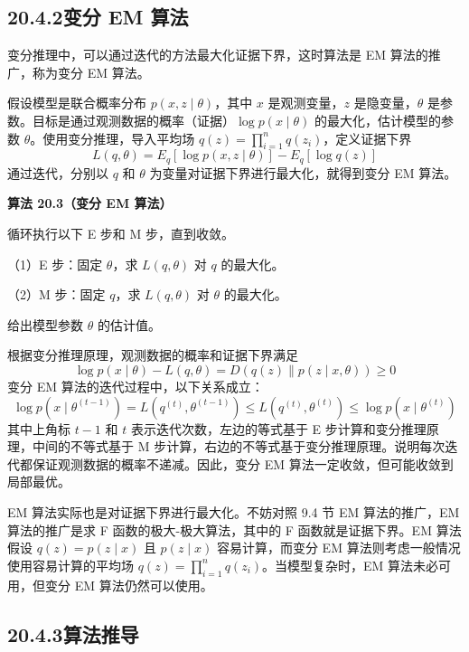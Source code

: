 \documentclass[UTF8, 12pt, fontset=fandol, oneside]{ctexart}
\begin{document}
\subsection*{20.4.2\quad 变分 EM 算法}

变分推理中，可以通过迭代的方法最大化证据下界，这时算法是 EM 算法的推广，称为变分 EM 算法。

假设模型是联合概率分布 $p(x,z\mid\theta)$，其中 $x$ 是观测变量，$z$ 是隐变量，$\theta$ 是参数。目标是通过观测数据的概率（证据）$\log p(x\mid\theta)$ 的最大化，估计模型的参数 $\theta$。使用变分推理，导入平均场 $q(z)=\prod_{i=1}^n q(z_i)$，定义证据下界
\begin{equation}
L(q,\theta)=E_q[\log p(x,z\mid\theta)]-E_q[\log q(z)]
\tag{20.39}
\end{equation}
通过迭代，分别以 $q$ 和 $\theta$ 为变量对证据下界进行最大化，就得到变分 EM 算法。

\noindent\textbf{算法 20.3（变分 EM 算法）}

循环执行以下 E 步和 M 步，直到收敛。

（1）E 步：固定 $\theta$，求 $L(q,\theta)$ 对 $q$ 的最大化。

（2）M 步：固定 $q$，求 $L(q,\theta)$ 对 $\theta$ 的最大化。

给出模型参数 $\theta$ 的估计值。

根据变分推理原理，观测数据的概率和证据下界满足
\begin{equation}
\log p(x\mid\theta)-L(q,\theta)=D(q(z)\|p(z\mid x,\theta))\geq 0
\tag{20.40}
\end{equation}
变分 EM 算法的迭代过程中，以下关系成立：
\begin{equation}
\log p(x\mid\theta^{(t-1)})=L(q^{(t)},\theta^{(t-1)})\leq L(q^{(t)},\theta^{(t)})\leq \log p(x\mid\theta^{(t)})
\tag{20.41}
\end{equation}
其中上角标 $t-1$ 和 $t$ 表示迭代次数，左边的等式基于 E 步计算和变分推理原理，中间的不等式基于 M 步计算，右边的不等式基于变分推理原理。说明每次迭代都保证观测数据的概率不递减。因此，变分 EM 算法一定收敛，但可能收敛到局部最优。

EM 算法实际也是对证据下界进行最大化。不妨对照 9.4 节 EM 算法的推广，EM 算法的推广是求 F 函数的极大-极大算法，其中的 F 函数就是证据下界。EM 算法假设 $q(z)=p(z\mid x)$ 且 $p(z\mid x)$ 容易计算，而变分 EM 算法则考虑一般情况使用容易计算的平均场 $q(z)=\prod_{i=1}^n q(z_i)$。当模型复杂时，EM 算法未必可用，但变分 EM 算法仍然可以使用。

\subsection*{20.4.3\quad 算法推导}
\end{document}
